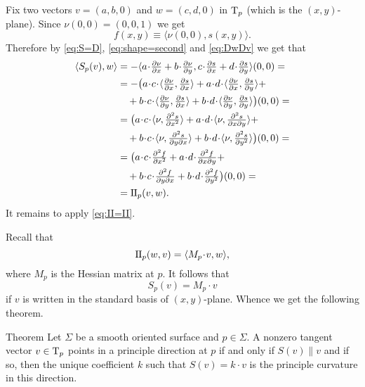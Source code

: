 Fix two vectors $v=(a,b,0)$ and $w=(c,d,0)$ in $\mathrm{T}_p$ (which is the $(x,y)$-plane).
Since $\nu(0,0)=(0,0,1)$ we get 
\[f(x,y)\equiv\langle\nu(0,0),s(x,y)\rangle.\]
Therefore by \ref{eq:S=D}, \ref{eq:shape=second} and \ref{eq:DwDv} we get that 
\begin{align*}
\langle S_p(v),w\rangle 
&=-\langle  a\cdot \tfrac{\partial \nu}{\partial x}+b\cdot \tfrac{\partial \nu}{\partial y},c\cdot \tfrac{\partial s}{\partial x}+d\cdot \tfrac{\partial s}{\partial y}\rangle(0,0)=
\\
&=-\bigl(a\cdot c\cdot\langle \tfrac{\partial \nu}{\partial x},\tfrac{\partial s}{\partial x}\rangle 
+a\cdot d\cdot\langle \tfrac{\partial \nu}{\partial x},\tfrac{\partial s}{\partial y}\rangle+
\\&\quad
+b\cdot c\cdot\langle \tfrac{\partial \nu}{\partial y},\tfrac{\partial s}{\partial x}\rangle
+b\cdot d\cdot\langle \tfrac{\partial \nu}{\partial y},\tfrac{\partial s}{\partial y}\rangle\bigr)(0,0)=
\\
&=\bigl(a\cdot c\cdot\langle \nu,\tfrac{\partial^2 s}{\partial x^2}\rangle 
+a\cdot d\cdot\langle \nu,\tfrac{\partial^2 s}{\partial x\partial y}\rangle+
\\&\quad
+b\cdot c\cdot\langle \nu,\tfrac{\partial^2 s}{\partial y\partial x}\rangle
+b\cdot d\cdot\langle \nu,\tfrac{\partial^2 s}{\partial y^2}\rangle\bigr)(0,0)=
\\
&=\bigl(a\cdot c\cdot\tfrac{\partial^2 f}{\partial x^2} 
+a\cdot d\cdot\tfrac{\partial^2 f}{\partial x\partial y}+
\\&\quad
+b\cdot c\cdot\tfrac{\partial^2 f}{\partial y\partial x}
+b\cdot d\cdot\tfrac{\partial^2 f}{\partial y^2}\bigr)(0,0)=
\\
&=\II_p(v,w).
\end{align*}
It remains to apply \ref{eq:II=II}.
\qeds

Recall that 
\[\II_p(w,v)=\langle M_p\cdot v,w\rangle,\]
where $M_p$ is the Hessian matrix at $p$.
It follows that 
\[S_p(v)=M_p\cdot v\]
if $v$ is written in the standard basis of $(x,y)$-plane.
Whence we get the following theorem. 

\begin{thm}{Theorem}\label{thm:rodrigues}
Let $\Sigma$ be a smooth oriented surface and $p\in \Sigma$.
A nonzero tangent vector $v\in \mathrm{T}_p$ points in a principle direction at $p$
if and only if $S(v)\parallel v$ and if so, then the unique coefficient $k$ such that
$S(v)=k\cdot v$ is the principle curvature in this direction.
\end{thm}


